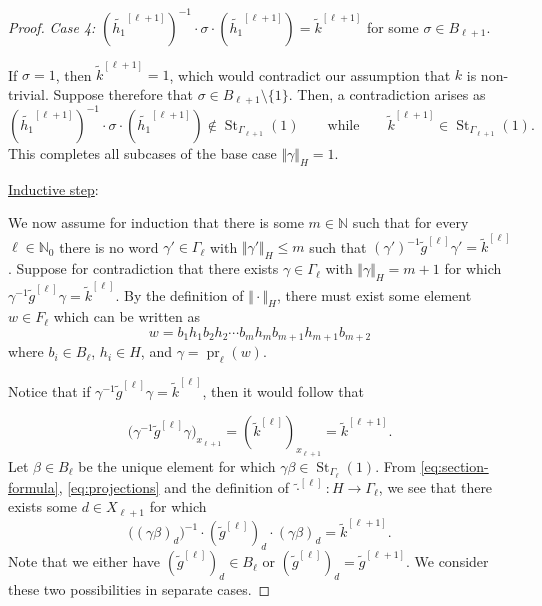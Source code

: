 \documentclass[a4paper]{amsart}
\renewcommand\leq\leqslant
\numberwithin{equation}{section}
\theoremstyle{definition}
\theoremstyle{remark}
\newcommand{\N}{\mathbb{N}}
\DeclareMathOperator{\pr}{pr}
\DeclareMathOperator{\St}{St}
\newcommand{\absH}[1]{\Vert #1 \Vert_H}
\begin{document}
\begin{proof}
\medskip

\noindent\textit{Case 4:}
$(\widetilde{h_1}^{[\ell+1]})^{-1}\cdot \sigma\cdot (\widetilde{h_1}^{[\ell+1]}) = \widetilde{k}^{[\ell+1]}$ for some $\sigma\in B_{\ell+1}$.

\smallskip\noindent
If $\sigma = 1$, then $\widetilde{k}^{[\ell+1]} = 1$, which would contradict our assumption that $k$ is non-trivial.
Suppose therefore that $\sigma \in B_{\ell+1}\setminus \{1\}$.
Then, a contradiction arises as
\[									 
(\widetilde{h_1}^{[\ell+1]})^{-1}\cdot \sigma\cdot (\widetilde{h_1}^{[\ell+1]})\notin \St_{\Gamma_{\ell+1}}(1)
\qquad
\text{while}
\qquad
\widetilde{k}^{[\ell+1]}\in \St_{\Gamma_{\ell+1}}(1).
\]
This completes all subcases of the base case $\absH{\gamma}=1$.

\medskip

\noindent\underline{Inductive step}:
\nopagebreak

\nopagebreak\smallskip
\nopagebreak\noindent
We now assume for induction that there is some $m\in \N$ such that for every $\ell\in\N_0$ there is no word $\gamma'\in\Gamma_\ell$ with $\absH{\gamma'}\leq m$ such that $(\gamma')^{-1} \widetilde{g}^{[\ell]} \gamma' = \widetilde{k}^{[\ell]}$.
Suppose for contradiction that there exists $\gamma\in \Gamma_\ell$ with $\absH{\gamma}=m+1$ for which $\gamma^{-1} \widetilde{g}^{[\ell]} \gamma = \widetilde{k}^{[\ell]}$.
By the definition of $\absH{\cdot}$, there must exist some element $w\in F_\ell$ which can be written as
\[
    w = b_1 h_1 b_2 h_2 \cdots b_m h_m b_{m+1} h_{m+1} b_{m+2} 
\]
where $b_i\in B_\ell$, $h_i\in H$, and $\gamma = \pr_\ell(w)$.

Notice that if $\gamma^{-1} \widetilde{g}^{[\ell]} \gamma = \widetilde{k}^{[\ell]}$, then it would follow that

\begin{equation}\label{eq:projections}
    \bigl(\gamma^{-1} \widetilde{g}^{[\ell]} \gamma\bigr)_{x_{\ell+1}}
    =
    (\widetilde{k}^{[\ell]})_{x_{\ell+1}}
    =
    \widetilde{k}^{[\ell+1]}.
\end{equation}
Let $\beta\in B_\ell$ be the unique element for which
$
    \gamma\beta\in \St_{\Gamma_\ell}(1).
$
From \eqref{eq:section-formula}, \eqref{eq:projections} and the definition of $\widetilde{\cdot}^{[\ell]}\colon H \to \Gamma_\ell$, we see that there exists some $d\in X_{\ell+1}$ for which
\begin{equation}\label{eq:projections2}
    \bigl((\gamma\beta)_{d}\bigr)^{-1}
    \cdot (\widetilde{g}^{[\ell]})_d
    \cdot (\gamma\beta)_{d}
    =
    \widetilde{k}^{[\ell+1]}.
\end{equation}
Note that we either have $(\widetilde{g}^{[\ell]})_d\in B_\ell$ or $(\widetilde{g}^{[\ell]})_d = \widetilde{g}^{[\ell+1]}$.
We consider these two possibilities in separate cases.


\end{proof}
\end{document}
